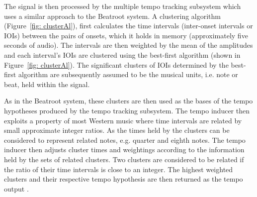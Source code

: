\documentclass[a4paper, 11pt]{article}
\begin{document}
The signal is then processed by the multiple tempo tracking subsystem which uses a similar approach to the Beatroot system. A clustering algorithm (Figure~\ref{fig: clusterAl}), first calculates the time intervals (inter-onset intervals or IOIs) between the pairs of onsets, which it holds in memory (approximately five seconds of audio). The intervals are then weighted by the mean of the amplitudes and each interval's IOIs are clustered using the best-first algorithm (shown in Figure~\ref{fig: clusterAl}). The significant clusters of IOIs determined by the best-first algorithm are subsequently assumed to be the musical units, i.e. note or beat, held within the signal. 

As in the Beatroot system, these clusters are then used as the bases of the tempo hypotheses produced by the tempo tracking subsystem. The tempo inducer then exploits a property of most Western music where time intervals are related by small approximate integer ratios. As the times held by the clusters can be considered to represent related notes, e.g. quarter and eighth notes. The tempo inducer then adjusts cluster times and weightings according to the information held by the sets of related clusters. Two clusters are considered to be related if the ratio of their time intervals is close to an integer. The highest weighted clusters and their respective tempo hypothesis are then returned as the tempo output \cite{dixonGoeblWidmer}.
\end{document}
